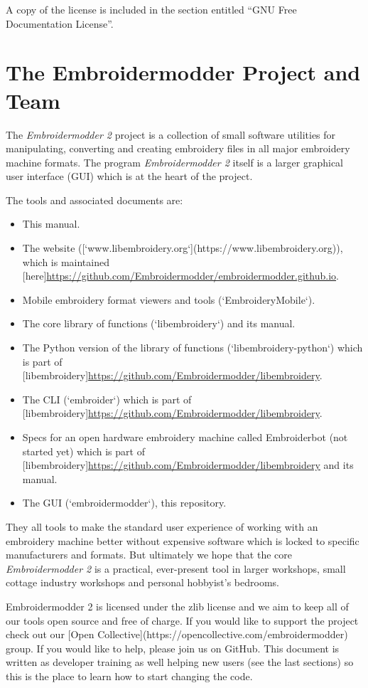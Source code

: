 \documentclass{report}
\begin{document}
A copy of the license is included in the section entitled ``GNU Free Documentation License''.


\section{The Embroidermodder Project and Team}

The \textit{Embroidermodder 2} project is a collection of small software utilities for
manipulating, converting and creating embroidery files in all major embroidery
machine formats. The program \textit{Embroidermodder 2} itself is a larger graphical
user interface (GUI) which is at the heart of the project.

The tools and associated documents are:

\begin{itemize}
\item This manual.
\item The website ([`www.libembroidery.org`](https://www.libembroidery.org)), which is maintained [here]\url{https://github.com/Embroidermodder/embroidermodder.github.io}.
\item Mobile embroidery format viewers and tools (`EmbroideryMobile`).
\item The core library of functions (`libembroidery`) and its manual.
\item The Python version of the library of functions (`libembroidery-python`) which is part of [libembroidery]\url{https://github.com/Embroidermodder/libembroidery}.
\item The CLI (`embroider`) which is part of [libembroidery]\url{https://github.com/Embroidermodder/libembroidery}.
\item Specs for an open hardware embroidery machine called Embroiderbot (not started yet) which is part of [libembroidery]\url{https://github.com/Embroidermodder/libembroidery} and its manual.
\item The GUI (`embroidermodder`), this repository.
\end{itemize}

They all tools to make the standard
user experience of working with an embroidery machine better without expensive
software which is locked to specific manufacturers and formats. But ultimately
we hope that the core \emph{Embroidermodder 2} is a practical, ever-present tool in
larger workshops, small cottage industry workshops and personal hobbyist's
bedrooms.

Embroidermodder 2 is licensed under the zlib license and we aim to keep all of
our tools open source and free of charge. If you would like to support the
project check out our [Open Collective](https://opencollective.com/embroidermodder) group. If you would like to help, please
join us on GitHub. This document is written as developer training as well
helping new users (see the last sections) so this is the place to learn how
to start changing the code.
\end{document}
